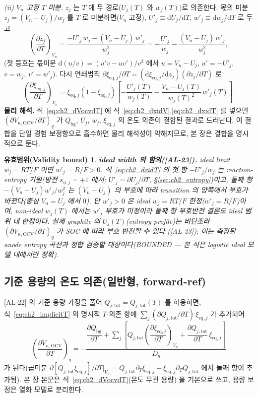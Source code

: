 \documentclass[11pt,a4paper]{article}
\newtheorem*{boundbox}{유효범위(Validity bound)}
\newcommand{\dd}{\mathrm{d}}
\newcommand{\eq}{\mathrm{eq}}
\newcommand{\bg}{\mathrm{bg}}
\newcommand{\OCV}{\mathrm{OCV}}
\newcommand{\tot}{\mathrm{tot}}
\newcommand{\AL}[1]{\textsf{[AL-#1]}}
\begin{document}
\emph{(ii) $V_n$ 고정 $T$ 미분.} $z_j$ 는 $T$ 에 두 경로($U_j(T)$ 와 $w_j(T)$)로 의존한다. 몫의 미분
$z_j=(V_n-U_j)/w_j$ 를 $T$ 로 미분하면($V_n$ 고정), $U'_j\equiv\dd U_j/\dd T$, $w'_j\equiv\dd w_j/\dd T$ 로
두고
\begin{equation}
\left(\frac{\partial z_j}{\partial T}\right)_{V_n}=\frac{-U'_j\,w_j-(V_n-U_j)\,w'_j}{w_j^2}
=-\frac{U'_j}{w_j}-\frac{(V_n-U_j)\,w'_j}{w_j^2},
\label{eq:ch2_dzdT}
\end{equation}
(첫 등호는 몫미분 $\dd(u/v)=(u'v-uv')/v^2$ 에서 $u=V_n-U_j$, $u'=-U'_j$, $v=w_j$, $v'=w'_j$). 다시 연쇄법칙
$\partial\xi_{\eq,j}/\partial T=(\dd\xi_{\eq,j}/\dd z_j)(\partial z_j/\partial T)$ 로
\begin{equation}
\left(\frac{\partial\xi_{\eq,j}}{\partial T}\right)_{V_n}
=\xi_{\eq,j}(1-\xi_{\eq,j})\left[-\frac{U'_j(T)}{w_j(T)}-\frac{V_n-U_j(T)}{w_j(T)^2}\,w'_j(T)\right].
\label{eq:ch2_dxidT}
\end{equation}
\textbf{물리 해석.} 식~\eqref{eq:ch2_dVocvdT} 에 식~\eqref{eq:ch2_dxidV},\eqref{eq:ch2_dxidT} 를 넣으면
$(\partial V_{n,\OCV}/\partial T)_q$ 가 $Q_\bg$, $U_j$, $w_j$, $\xi_{\eq,j}$ 의 온도 의존이 결합된 결과로
드러난다. 이 결합을 단일 경험 보정항으로 흡수하면 물리 해석성이 약해지므로, 본 장은 결합을 명시적으로 둔다.
\begin{boundbox}
\textbf{ideal width 의 함의(\AL{23}).} ideal limit $w_j=RT/F$ 이면 $w'_j=R/F>0$. 식~\eqref{eq:ch2_dxidT} 의
첫 항 $-U'_j/w_j$ 는 reaction-entropy 기원(방전 $s_{\phi,j}=+1$ 에서; $U'_j=\partial U_j/\partial T$, \S\ref{sec:ch2_entropy})이고, 둘째
항 $-(V_n-U_j)w'_j/w_j^2$ 는 $(V_n-U_j)$ 의 부호에 따라 transition 의 양쪽에서 부호가 바뀐다(중심 $V_n=U_j$
에서 $0$). 단 $w'_j>0$ 은 ideal $w_j=RT/F$ 한정($w'_j=R/F$)이며, non-ideal $w_j(T)$ 에서는 $w'_j$ 부호가
미정이라 둘째 항 부호반전 결론도 ideal 범위 내 한정이다. 실제 graphite 의 $U_j(T)$(entropy profile)는 비단조라 $(\partial V_{n,\OCV}/\partial T)_q$ 가
SOC 에 따라 부호 반전할 수 있다 \cite{reynier2004,thomasnewman2003}(\AL{23}); 이는 측정된 anode entropy
곡선과 정합 검증할 대상이다(BOUNDED — 본 식은 logistic ideal 모델 내에서만 정확).
\end{boundbox}

\subsection{기준 용량의 온도 의존(일반형, forward-ref)}\label{sec:ch2_ocvT_general}
\AL{22} 의 기준 용량 가정을 풀어 $Q_{j,\tot}=Q_{j,\tot}(T)$ 를 허용하면, 식~\eqref{eq:ch2_implicitT} 의 명시적
$T$-의존 항에 $\sum_j(\partial Q_{j,\tot}/\partial T)\,\xi_{\eq,j}$ 가 추가되어
\begin{equation}
\left(\frac{\partial V_{n,\OCV}}{\partial T}\right)_q
=-\frac{\dfrac{\partial Q_\bg}{\partial T}+\displaystyle\sum_j\!\left[Q_{j,\tot}\!\left(\dfrac{\partial\xi_{\eq,j}}{\partial T}\right)_{V_n}\!\!+\dfrac{\partial Q_{j,\tot}}{\partial T}\,\xi_{\eq,j}\right]}{D_q}
\label{eq:ch2_dVocvdT_gen}
\end{equation}
가 된다(곱미분 $\partial[Q_{j,\tot}\xi_{\eq,j}]/\partial T|_{V_n}=Q_{j,\tot}\partial_T\xi_{\eq,j}+\xi_{\eq,j}\partial_T Q_{j,\tot}$
에서 둘째 항이 추가됨). 본 장 본문은 식~\eqref{eq:ch2_dVocvdT}(온도 무관 용량) 을 기본으로 쓰고, 용량 보정은
열화 모델로 분리한다.
\end{document}
